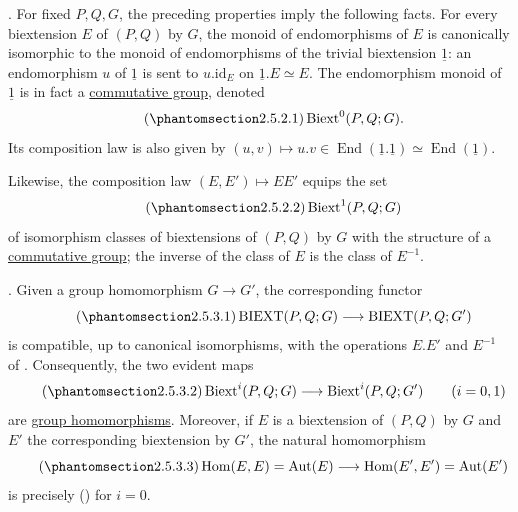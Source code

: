 . For fixed $P,Q,G$, the preceding properties imply the
following facts. For every biextension $E$ of $(P,Q)$ by $G$, the
monoid of endomorphisms of $E$ is canonically isomorphic to the monoid
of endomorphisms of the trivial biextension $\underline 1$: an
endomorphism $u$ of $\underline 1$ is sent to
$u.\mathrm{id}_E$ on $\underline 1.E\simeq E$. The endomorphism monoid
of $\underline 1$ is in fact a \underline{commutative group}, denoted
\begin{equation}\tag{\SGARefTarget{sga7.sga7i.evii.n2-5-2-1}{2.5.2.1}}
 \operatorname{Biext}^{0}(P,Q;G).
\end{equation}
Its composition law is also given by
$(u,v)\mapsto u.v\in
\operatorname{End}(\underline 1.\underline 1)
\simeq\operatorname{End}(\underline 1)$.

Likewise, the composition law $(E,E')\mapsto EE'$ equips the set
\begin{equation}\tag{\SGARefTarget{sga7.sga7i.evii.n2-5-2-2}{2.5.2.2}}
 \operatorname{Biext}^{1}(P,Q;G)
\end{equation}
of isomorphism classes of biextensions of $(P,Q)$ by $G$ with the
structure of a \underline{commutative group}; the inverse of the class
of $E$ is the class of $E^{-1}$.

. Given a group homomorphism $G\longrightarrow G'$, the
corresponding functor
\begin{equation}\tag{\SGARefTarget{sga7.sga7i.evii.n2-5-3-1}{2.5.3.1}}
 \operatorname{BIEXT}(P,Q;G)
 \longrightarrow
 \operatorname{BIEXT}(P,Q;G')
\end{equation}
is compatible, up to canonical isomorphisms, with the operations
$E.E'$ and $E^{-1}$ of . Consequently, the two evident maps
\begin{equation}\tag{\SGARefTarget{sga7.sga7i.evii.n2-5-3-2}{2.5.3.2}}
 \operatorname{Biext}^{i}(P,Q;G)
 \longrightarrow
 \operatorname{Biext}^{i}(P,Q;G')
 \qquad(i=0,1)
\end{equation}
are \underline{group homomorphisms}. Moreover, if $E$ is a
biextension of $(P,Q)$ by $G$ and $E'$ the corresponding
biextension by $G'$, the natural homomorphism
\begin{equation}\tag{\SGARefTarget{sga7.sga7i.evii.n2-5-3-3}{2.5.3.3}}
 \operatorname{Hom}(E,E)=\operatorname{Aut}(E)
 \longrightarrow
 \operatorname{Hom}(E',E')=\operatorname{Aut}(E')
\end{equation}
is precisely () for $i=0$.

